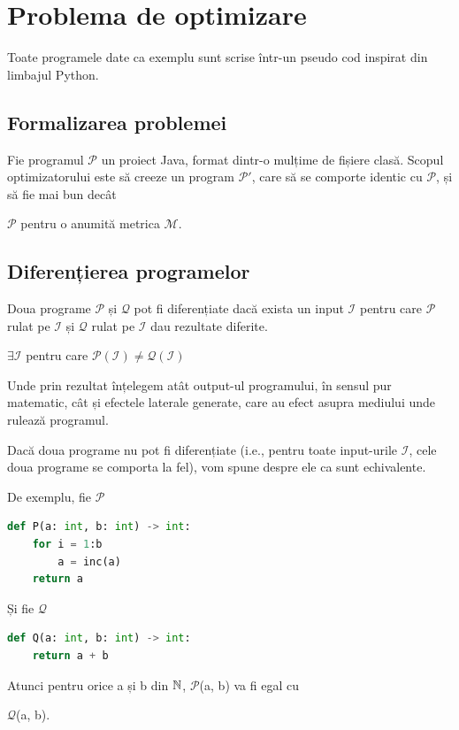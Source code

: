 \newcommand{\s}[1]{
	\(\mathcal{#1}\)}

\chapter{Problema de optimizare}

Toate programele date ca exemplu sunt scrise într-un pseudo cod inspirat
din limbajul Python.

\section{Formalizarea problemei}

Fie programul \s{P} un proiect Java, format dintr-o mulțime de fișiere
clasă.  Scopul optimizatorului este să creeze un program \s{P'}, care
să se comporte identic cu \s{P}, și să fie mai bun decât
\s{P} pentru o anumită metrica \s{M}.

\section{Diferențierea programelor}

Doua programe \s{P} și \s{Q} pot fi diferențiate dacă
exista un input \s{I} pentru care \s{P} rulat pe \s{I}
și \s{Q} rulat pe \s{I} dau rezultate diferite.

\(\exists \mathcal{I}\) pentru care \(\mathcal{P}(\mathcal{I}) \ne
\mathcal{Q}(\mathcal{I}) \)

Unde prin rezultat înțelegem atât output-ul programului, în
sensul pur matematic, cât și efectele laterale generate, care au
efect asupra mediului unde rulează programul.

Dacă doua programe nu pot fi diferențiate (i.e., pentru toate
input-urile \s{I}, cele doua programe se comporta la fel), vom
spune despre ele ca sunt echivalente.

De exemplu, fie \s{P}

\begin{lstlisting}[language=Python,label={programul_p}]
def P(a: int, b: int) -> int:
    for i = 1:b
        a = inc(a)
    return a
\end{lstlisting}

Și fie \s{Q}

\begin{lstlisting}[language=Python,label={programul_q}]
def Q(a: int, b: int) -> int:
    return a + b
\end{lstlisting}

Atunci pentru orice a și b din $\mathbb{N}$, \s{P}(a, b) va fi egal cu
\s{Q}(a, b).

